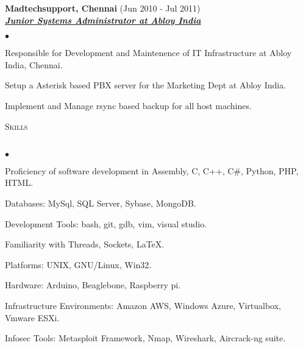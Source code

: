 \documentclass{article}
\newcommand{\lineunder}{\vspace*{-8pt} \\ \hspace*{-18pt} \hrulefill \\}
\newcommand{\header}[1]{{\hspace*{-15pt}\vspace*{6pt} \textsc{#1}} \vspace*{-6pt} \lineunder}
\newcommand{\employer}[3]{{ \textbf{#1} (#2)\\ \underline{\textbf{\emph{#3}}}\\  }}
\newenvironment{achievements}{\begin{list}{$\bullet$}{\topsep 0pt \itemsep -2pt}}{\vspace*{4pt}\end{list}}
\begin{document}
\employer{Madtechsupport, Chennai}{Jun 2010 - Jul 2011}{Junior Systems Administrator at Abloy India}
    \begin{achievements}
    \item Responsible for Development and Maintenence of IT Infrastructure at Abloy India, Chennai.
	\item Setup a Asterisk based PBX server for the Marketing Dept at Abloy India.
	\item Implement and Manage rsync based backup for all host machines.
    \end{achievements}

\header{Skills}
\begin{achievements}
\item Proficiency of software development in Assembly, C, C++, C\#, Python, PHP, HTML.
\item Databases: MySql, SQL Server, Sybase, MongoDB.
\item Development Tools: bash, git, gdb, vim, visual studio.
\item Familiarity with Threads, Sockets, \LaTeX.
\item Platforms: UNIX, GNU/Linux, Win32.
\item Hardware: Arduino, Beaglebone, Raspberry pi.
\item Infrastructure Environments: Amazon AWS, Windows Azure, Virtualbox, Vmware ESXi.
\item Infosec Tools: Metasploit Framework, Nmap, Wireshark, Aircrack-ng suite.
\end{achievements}
\end{document}
